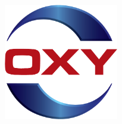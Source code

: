 \documentclass[
	a4paper, %
	12pt,%
]{CSSullivanBusinessReport}
\begin{document}
\thispagestyle{empty} %

\begin{fullwidth} %
	\vspace*{-0.075\textheight} %
	
	\hfill\includegraphics[width=5cm]{Images/OXY.png} %
	\vspace{0.15\textheight} %

	\parbox{0.9\fulltextwidth}{\fontsize{50pt}{52pt}\selectfont\raggedright\textbf{\reporttitle}\par} %
	
	\vspace{0.03\textheight} %
	
	{\LARGE\textit{\textbf{\reportsubtitle}}\par} %
	
	\vfill %
	
	{\Large\reportauthors\par} %
	
	\vfill\vfill\vfill %
	
	{\large\reportdate\par} %
\end{fullwidth}

\newpage

\end{document}
